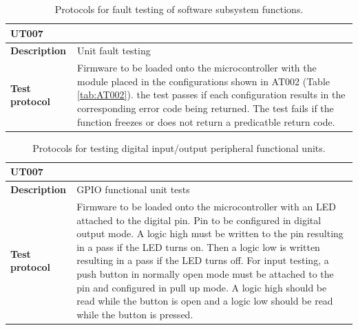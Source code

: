 \begin{table}[H]
	\centering
	\setlength{\extrarowheight}{5pt}
	\caption{ Protocols for fault testing of software subsystem functions.}
	\label{tab:UT007}
	\begin{tabular}{m{} m{}}
		\multicolumn{2}{l}{\textbf{UT007} }\\
		\hline
		\textbf{Description} & Unit fault testing\\
		\hline
		\hline
		\textbf{Test protocol} & Firmware to be loaded onto the microcontroller with the module placed in the configurations shown in AT002 (Table \ref{tab:AT002}). the test passes if each configuration results in the corresponding error code being returned. The test fails if the function freezes or does not return a predicatble return code.  \\
		\hline
		\hline
	\end{tabular}
\end{table}

\begin{table}[H]
	\centering
	\setlength{\extrarowheight}{5pt}
	\caption{ Protocols for testing digital input/output peripheral functional units.}
	\label{tab:UT008}
	\begin{tabular}{m{} m{}}
		\multicolumn{2}{l}{\textbf{UT007} }\\
		\hline
		\textbf{Description} & GPIO functional unit tests\\
		\hline
		\hline
		\textbf{Test protocol} & Firmware to be loaded onto the microcontroller with an LED attached to the digital pin. Pin to be configured in digital output mode. A logic high must be written to the pin resulting in a pass if the LED turns on. Then a logic low is written resulting in a pass if the LED turns off. For input testing, a push button in normally open mode must be attached to the pin and configured in pull up mode. A logic high should be read while the button is open and a logic low should be read while the button is pressed. \\
		\hline
		\hline
	\end{tabular}
\end{table}
